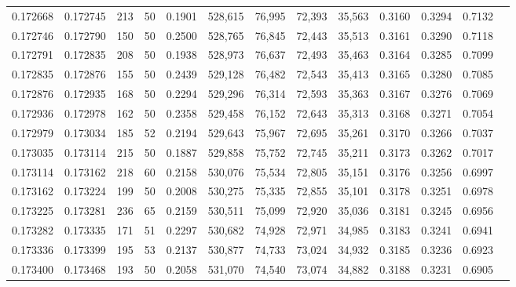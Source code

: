 \begin{tabular}{rrrrrrrrrrrrr}
0.172668 & 0.172745 &   213 &  50 &                                     0.1901 & 528,615 &  76,995 &  72,393 &  35,563 & 0.3160 & 0.3294 & 0.7132 \\
0.172746 & 0.172790 &   150 &  50 &                                     0.2500 & 528,765 &  76,845 &  72,443 &  35,513 & 0.3161 & 0.3290 & 0.7118 \\
0.172791 & 0.172835 &   208 &  50 &                                     0.1938 & 528,973 &  76,637 &  72,493 &  35,463 & 0.3164 & 0.3285 & 0.7099 \\
0.172835 & 0.172876 &   155 &  50 &                                     0.2439 & 529,128 &  76,482 &  72,543 &  35,413 & 0.3165 & 0.3280 & 0.7085 \\
0.172876 & 0.172935 &   168 &  50 &                                     0.2294 & 529,296 &  76,314 &  72,593 &  35,363 & 0.3167 & 0.3276 & 0.7069 \\
0.172936 & 0.172978 &   162 &  50 &                                     0.2358 & 529,458 &  76,152 &  72,643 &  35,313 & 0.3168 & 0.3271 & 0.7054 \\
0.172979 & 0.173034 &   185 &  52 &                                     0.2194 & 529,643 &  75,967 &  72,695 &  35,261 & 0.3170 & 0.3266 & 0.7037 \\
0.173035 & 0.173114 &   215 &  50 &                                     0.1887 & 529,858 &  75,752 &  72,745 &  35,211 & 0.3173 & 0.3262 & 0.7017 \\
0.173114 & 0.173162 &   218 &  60 &                                     0.2158 & 530,076 &  75,534 &  72,805 &  35,151 & 0.3176 & 0.3256 & 0.6997 \\
0.173162 & 0.173224 &   199 &  50 &                                     0.2008 & 530,275 &  75,335 &  72,855 &  35,101 & 0.3178 & 0.3251 & 0.6978 \\
0.173225 & 0.173281 &   236 &  65 &                                     0.2159 & 530,511 &  75,099 &  72,920 &  35,036 & 0.3181 & 0.3245 & 0.6956 \\
0.173282 & 0.173335 &   171 &  51 &                                     0.2297 & 530,682 &  74,928 &  72,971 &  34,985 & 0.3183 & 0.3241 & 0.6941 \\
0.173336 & 0.173399 &   195 &  53 &                                     0.2137 & 530,877 &  74,733 &  73,024 &  34,932 & 0.3185 & 0.3236 & 0.6923 \\
0.173400 & 0.173468 &   193 &  50 &                                     0.2058 & 531,070 &  74,540 &  73,074 &  34,882 & 0.3188 & 0.3231 & 0.6905 \\

\end{tabular}
